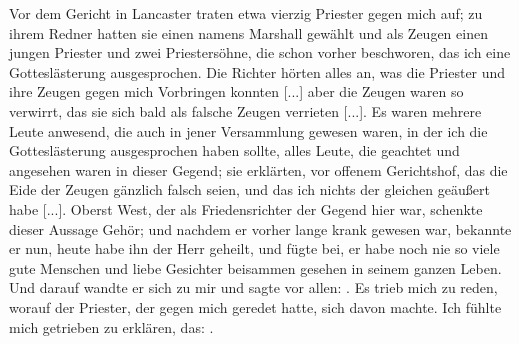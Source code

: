 Vor dem Gericht
in Lancaster traten etwa vierzig Priester gegen mich auf; zu ihrem
Redner hatten sie einen namens Marshall 
gewählt und als
Zeugen einen jungen Priester und zwei Priestersöhne, die schon
vorher beschworen, das ich eine Gotteslästerung ausgesprochen.
Die Richter hörten alles an, was die Priester und ihre Zeugen
gegen mich Vorbringen konnten [...] aber die Zeugen waren
so verwirrt, das sie sich bald als falsche Zeugen verrieten [...].
Es waren mehrere Leute anwesend, die auch in jener 
Versammlung gewesen waren, in der ich die Gotteslästerung
ausgesprochen haben sollte, alles Leute, die geachtet 
und angesehen waren
in dieser Gegend; sie erklärten, vor offenem Gerichtshof, das die
Eide der Zeugen gänzlich falsch seien, und das ich nichts der 
gleichen geäußert habe [...]. Oberst West, der als Friedensrichter
der Gegend hier war, schenkte dieser Aussage Gehör; und
nachdem er vorher lange krank gewesen war, bekannte er nun,
heute habe ihn der Herr geheilt, und fügte bei, er habe noch nie
so viele gute Menschen und liebe Gesichter beisammen gesehen in
seinem ganzen Leben. Und darauf wandte er sich zu mir und
sagte vor allen: . Es trieb mich zu reden,
worauf der Priester, der gegen mich geredet hatte, sich davon
machte. Ich fühlte mich getrieben zu erklären, das: 
. 

